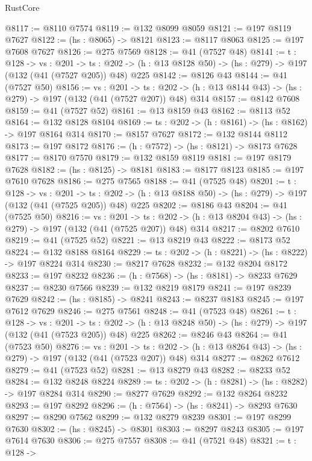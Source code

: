 \begin{lexlean}{RustCore}
\begin{coremodule}
@8117 := @8110 @7574
@8119 := @132 @8099 @8059
@8121 := @197 @8119 @7627
@8122 := (hs : @8065) -> @8121
@8123 := @8117 @8063
@8125 := @197 @7608 @7627
@8126 := @275 @7569
@8128 := @41 (@7527 @48)
@8141 := {t : @128} ->
  {vs : @201} ->
  {ts : @202} -> (h : @13 @8128 @50) -> (hs : @279) -> @197 (@132 (@41 (@7527 @205)) @48) @225
@8142 := @8126 @43
@8144 := @41 (@7527 @50)
@8156 := {vs : @201} ->
  {ts : @202} -> (h : @13 @8144 @43) -> (hs : @279) -> @197 (@132 (@41 (@7527 @207)) @48) @314
@8157 := @8142 @7608
@8159 := @41 (@7527 @52)
@8161 := @13 @8159 @43
@8162 := @8113 @52
@8164 := @132 @8128 @8104
@8169 := {ts : @202} -> (h : @8161) -> (hs : @8162) -> @197 @8164 @314
@8170 := @8157 @7627
@8172 := @132 @8144 @8112
@8173 := @197 @8172
@8176 := (h : @7572) -> (hs : @8121) -> @8173 @7628
@8177 := @8170 @7570
@8179 := @132 @8159 @8119
@8181 := @197 @8179 @7628
@8182 := (hs : @8125) -> @8181
@8183 := @8177 @8123
@8185 := @197 @7610 @7628
@8186 := @275 @7565
@8188 := @41 (@7525 @48)
@8201 := {t : @128} ->
  {vs : @201} ->
  {ts : @202} -> (h : @13 @8188 @50) -> (hs : @279) -> @197 (@132 (@41 (@7525 @205)) @48) @225
@8202 := @8186 @43
@8204 := @41 (@7525 @50)
@8216 := {vs : @201} ->
  {ts : @202} -> (h : @13 @8204 @43) -> (hs : @279) -> @197 (@132 (@41 (@7525 @207)) @48) @314
@8217 := @8202 @7610
@8219 := @41 (@7525 @52)
@8221 := @13 @8219 @43
@8222 := @8173 @52
@8224 := @132 @8188 @8164
@8229 := {ts : @202} -> (h : @8221) -> (hs : @8222) -> @197 @8224 @314
@8230 := @8217 @7628
@8232 := @132 @8204 @8172
@8233 := @197 @8232
@8236 := (h : @7568) -> (hs : @8181) -> @8233 @7629
@8237 := @8230 @7566
@8239 := @132 @8219 @8179
@8241 := @197 @8239 @7629
@8242 := (hs : @8185) -> @8241
@8243 := @8237 @8183
@8245 := @197 @7612 @7629
@8246 := @275 @7561
@8248 := @41 (@7523 @48)
@8261 := {t : @128} ->
  {vs : @201} ->
  {ts : @202} -> (h : @13 @8248 @50) -> (hs : @279) -> @197 (@132 (@41 (@7523 @205)) @48) @225
@8262 := @8246 @43
@8264 := @41 (@7523 @50)
@8276 := {vs : @201} ->
  {ts : @202} -> (h : @13 @8264 @43) -> (hs : @279) -> @197 (@132 (@41 (@7523 @207)) @48) @314
@8277 := @8262 @7612
@8279 := @41 (@7523 @52)
@8281 := @13 @8279 @43
@8282 := @8233 @52
@8284 := @132 @8248 @8224
@8289 := {ts : @202} -> (h : @8281) -> (hs : @8282) -> @197 @8284 @314
@8290 := @8277 @7629
@8292 := @132 @8264 @8232
@8293 := @197 @8292
@8296 := (h : @7564) -> (hs : @8241) -> @8293 @7630
@8297 := @8290 @7562
@8299 := @132 @8279 @8239
@8301 := @197 @8299 @7630
@8302 := (hs : @8245) -> @8301
@8303 := @8297 @8243
@8305 := @197 @7614 @7630
@8306 := @275 @7557
@8308 := @41 (@7521 @48)
@8321 := {t : @128} ->

\end{coremodule}
\end{lexlean}
